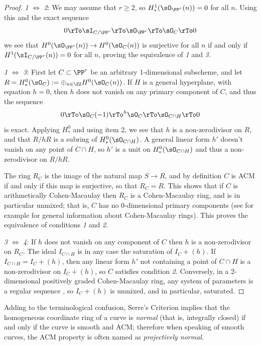 \begin{proof}
{\sl 1} $\Leftrightarrow$ {\sl 2}: We may assume that $r\geq 2$, so $H^1_*(\sO_{\PP^r}(n)) = 0$ for all $n$. Using this and the exact sequence 
$$
0\rTo \sI_{C/\PP^r}  \rTo  \sO_{\PP^r}  \rTo  \sO_C  \rTo  0
$$
we see that $H^0(\sO_{\PP^r}(n)) \to H^0(\sO_C(n))$ is surjective for all $n$ if and only if $H^1(\sI_{C/\PP^r}(n)) = 0$ for all $n$,
proving the equivalence of {\sl 1} and {\sl 3.}

{\sl 1} $\Leftrightarrow$ {\sl 3}: First let $C\subset \PP^r$ be an arbitrary 1-dimensional subscheme,
and let $R =H^0_*(\sO_{C}) := \oplus_{n\in \ZZ} H^0(\sO_{C}(n))$.
If $H$ is a 
general hyperplane, with equation $h=0$, then $h$ does not vanish on any primary component of $C$, and thus the sequence
$$
0\rTo \sO_C(-1) \rTo^{h}\sO_C\rTo \sO_{C\cap H}\rTo 0
$$
is exact. Applying $H^0_*$ and using item 2, we see that $h$ is a non-zerodivisor on $R$, and that $R/hR$ is
a subring of $H^0_*(\sO_{C\cap H})$.  A general linear form $h'$ doesn't vanish on
any point of $C\cap H$, so $h'$ is a unit on $H^0_*(\sO_{C\cap H})$
and thus a non-zerodivisor on $R/hR$. 

The ring $R_C$ is the image of the natural map $S\to R$, and by definition $C$ is ACM if and only if this map is surjective,
so that $R_C = R.$ This shows that if $C$ is arithmetically Cohen-Macaulay then $R_C$ is a Cohen-Macaulay ring,
and is in particular unmixed; that is, $C$ has no 0-dimensional primary components (see for example \cite[Chapter 18]{Eisenbud1995} for general
information about Cohen-Macaulay rings). This proves the equivalence of conditions {\sl 1} and {\sl 2.}


{\sl 3} $\Leftrightarrow$ {\sl 4}: If  $h$ does not vanish on any component of $C$ then $h$ is a non-zerodivisor on $R_C$. The ideal $I_{C\cap H}$ is in any case the saturation of $I_C+(h)$. 
If $I_{C\cap H}=I_C+(h)$, then any linear form $h'$ not containing a point of $C\cap H$ is a non-zerodivisor
on $I_C+(h)$, so $C$ satisfies condition {\sl 2}. Conversely, in a 2-dimensional positively graded Cohen-Macaulay ring, any 
system of parameters is a regular sequence \cite[Section 18.2]{Eisenbud1995}, so $I_C+(h)$ is unmixed, and in particular, saturated.
\end{proof}



Adding to the terminological confusion, Serre's Criterion implies that the homogeneous coordinate ring
of a curve is \emph{normal} (that is, integrally closed) if and only if the curve is smooth and ACM; therefore
when speaking of smooth curves, the ACM property is often named as \emph{projectively normal}.

